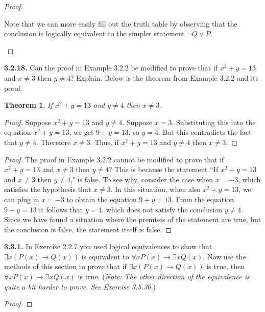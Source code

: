 \documentclass[12pt]{amsart}
\newenvironment{statement}[1]{\smallskip\noindent\color[rgb]{.6627, .3529, .6314} {\bf #1.}}{}
\newtheorem{theorem}{Theorem}
\theoremstyle{definition}
\theoremstyle{remark}
\begin{document}
\begin{proof}
\begin{enumerate}
	Note that we can more easily fill out the truth table by observing that the conclusion
	is logically equivalent to the simpler statement $\neg Q \vee P$.
\end{enumerate}
\end{proof}


\begin{statement}{3.2.18}
Can the proof in Example 3.2.2 be modified to prove that if $x^2 + y = 13$ and $x \neq 3$ then $y \neq 4$?
Explain.
Below is the theorem from Example 3.2.2 and its proof.
\begin{theorem}
	If $x^2 + y = 13$ and $y \neq 4$ then $x \neq 3$.
\end{theorem}
\begin{proof}
	Suppose $x^2 + y = 13$ and $y \neq 4$.
	Suppose $x = 3$.
	Substituting this into the equation $x^2 + y = 13$, we get $9 + y = 13$, so $y = 4$.
	But this contradicts the fact that $y \neq 4$.
	Therefore $x \neq 3$.
	Thus, if $x^2 + y = 13$ and $y \neq 4$ then $x \neq 3$.
\end{proof}
\end{statement}

\begin{proof}
The proof in Example 3.2.2 cannot be modified to prove that if $x^2 + y = 13$ and $x \neq 3$ then $y \neq 4$?
This is because the statement ``If $x^2 + y = 13$ and $x \neq 3$ then $y \neq 4$," is false.
To see why, consider the case when $x = -3$, which satisfies the hypothesis that $x \neq 3$.
In this situation, when also $x^2 + y = 13$, we can plug in $x = -3$ to obtain the equation $9 + y = 13$.
From the equation $9 + y = 13$ it follows that $y = 4$, which does not satisfy the conclusion $y \neq 4$.
Since we have found a situation where the premises of the statement are true, but the conclusion is false, the statement itself is false.
\end{proof}


\begin{statement}{3.3.1}
In Exercise 2.2.7 you used logical equivalences to show that $\exists x (P(x) \rightarrow Q(x))$ is equivalent to $\forall x P(x) \rightarrow \exists x Q(x)$.
Now use the methods of this section to prove that if $\exists x (P(x) \rightarrow Q(x))$ is true, then $\forall x P(x) \rightarrow \exists x Q(x)$ is true.
(\emph{Note: The other direction of the equivalence is quite a bit harder to prove.
See Exercise 3.5.30.})
\end{statement}

\begin{proof}
\end{proof}
\end{document}
